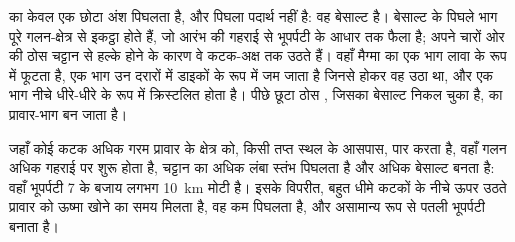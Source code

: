  का केवल एक छोटा अंश पिघलता है, और पिघला पदार्थ  नहीं है:
वह बेसाल्ट है। बेसाल्ट के पिघले भाग पूरे गलन-क्षेत्र से इकट्ठा होते हैं, जो
आरंभ की गहराई से भूपर्पटी के आधार तक फैला है; अपने चारों ओर की ठोस चट्टान से
हल्के होने के कारण वे कटक-अक्ष तक उठते हैं। वहाँ मैग्मा का एक भाग
लावा के रूप में फूटता है, एक भाग उन दरारों में डाइकों के रूप में जम जाता है जिनसे होकर वह उठा था, और एक भाग
नीचे धीरे-धीरे  के रूप में क्रिस्टलित होता है। पीछे छूटा ठोस ,
जिसका बेसाल्ट निकल चुका है,  का प्रावार-भाग बन जाता है।

जहाँ कोई कटक अधिक गरम प्रावार के क्षेत्र को, किसी तप्त स्थल के आसपास, पार करता है, वहाँ गलन
अधिक गहराई पर शुरू होता है, चट्टान का अधिक लंबा स्तंभ पिघलता है और अधिक बेसाल्ट बनता है: वहाँ
भूपर्पटी 7 के बजाय लगभग \qty{10}{km} मोटी है। इसके विपरीत, बहुत
धीमे कटकों के नीचे ऊपर उठते प्रावार को ऊष्मा खोने का समय मिलता है, वह कम पिघलता है, और
असामान्य रूप से पतली भूपर्पटी बनाता है।

